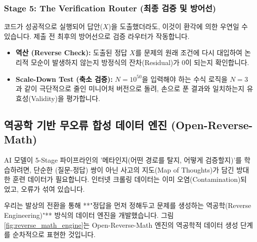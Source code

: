 \subsubsection{Stage 5: The Verification Router (최종 검증 및 방어선)}
코드가 성공적으로 실행되어 답안($X$)을 도출했더라도, 이것이 환각에 의한 우연일 수 있습니다. 제출 전 최후의 방어선으로 검증 라우터가 작동합니다.
\begin{itemize}
    \item \textbf{역산 (Reverse Check):} 도출된 정답 $X$를 문제의 원래 조건에 다시 대입하여 논리적 모순이 발생하지 않는지 방정식의 잔차(Residual)가 0이 되는지 확인합니다.
    \item \textbf{Scale-Down Test (축소 검증):} $N=10^{50}$을 입력해야 하는 수식 로직을 $N=3$과 같이 극단적으로 줄인 미니어처 버전으로 돌려, 손으로 푼 결과와 일치하는지 유효성(Validity)을 평가합니다.
\end{itemize}

\subsection{역공학 기반 무오류 합성 데이터 엔진 (Open-Reverse-Math)}
AI 모델이 5-Stage 파이프라인의 '메타인지(어떤 경로를 탈지, 어떻게 검증할지)'를 학습하려면, 단순한 (질문-정답) 쌍이 아닌 사고의 지도(Map of Thoughts)가 담긴 방대한 훈련 데이터가 필요합니다. 인터넷 크롤링 데이터는 이미 오염(Contamination)되었고, 오류가 섞여 있습니다.

우리는 발상의 전환을 통해 **"정답을 먼저 정해두고 문제를 생성하는 역공학(Reverse Engineering)"** 방식의 데이터 엔진을 개발했습니다. 그림 \ref{fig:reverse_math_engine}는 Open-Reverse-Math 엔진의 역공학적 데이터 생성 단계를 순차적으로 표현한 것입니다.

